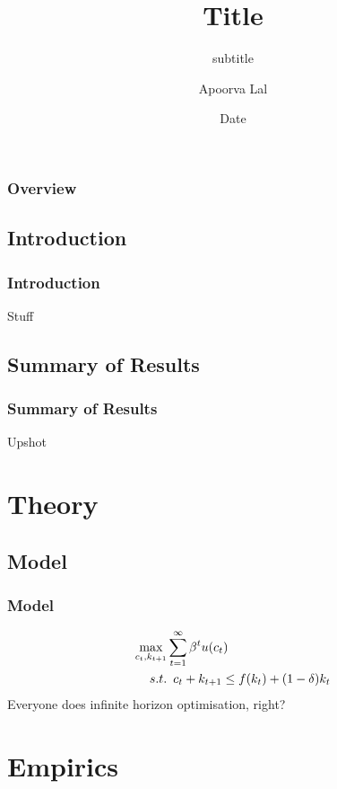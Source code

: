 \documentclass[11pt, aspectratio=169]{beamer}
\title{Title}
\subtitle{subtitle}
\author{Apoorva Lal}
\institute{Stanford}
\date{Date}
\begin{document}
\frame{\titlepage}
\begin{frame}
\frametitle{Overview}
\tableofcontents
\end{frame}

\subsection{Introduction}
\begin{frame}\frametitle{Introduction}
Stuff
\cite{angristMostlyHarmlessEconometrics2008}
\end{frame}
\subsection{Summary of Results}
\begin{frame}[t]\frametitle{Summary of Results}
Upshot
\end{frame}


\section{Theory}
\tableofcontents[currentsection,subsubsectionstyle=hide]
\subsection{Model}
\begin{frame}[t]\frametitle{Model}
\begin{align*}
\maximise_{c_t,k_{t+1}} &  \sum_{t=1}^{\infty} \beta^t u(c_t)  \\
  s.t. & \enspace c_{t} + k_{t+1} \leq f(k_t) + (1-\delta)k_t
\end{align*}
Everyone does infinite horizon optimisation, right?
\end{frame}
\section{Empirics}
\end{document}
